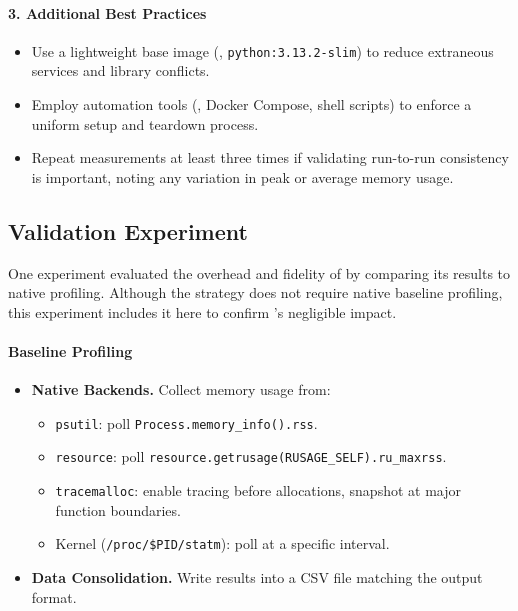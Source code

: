 \paragraph{3. Additional Best Practices}
\begin{itemize}
    \item Use a lightweight base image (\eg, \texttt{python:3.13.2-slim}) to reduce extraneous services and library conflicts.
    \item Employ automation tools (\eg, Docker Compose, shell scripts) to enforce a uniform setup and teardown process.
    \item Repeat measurements at least three times if validating run-to-run consistency is important, noting any variation in peak or average memory usage.
\end{itemize}

\subsection{Validation Experiment}
\label{subsec:validation-experiment}

One experiment evaluated the overhead and fidelity of \traceq by comparing its results to native profiling.
Although the strategy does not require native baseline profiling, this experiment includes it here to confirm \traceq's negligible impact.

\paragraph{Baseline Profiling}
\begin{itemize}

    \item \textbf{Native Backends.} Collect memory usage from:
    \begin{itemize}
        \item \texttt{psutil}: poll \texttt{Process.memory\_info().rss}.
        \item \texttt{resource}: poll \texttt{resource.getrusage(RUSAGE\_SELF).ru\_maxrss}.
        \item \texttt{tracemalloc}: enable tracing before allocations, snapshot at major function boundaries.
        \item Kernel (\texttt{/proc/\$PID/statm}): poll at a specific interval.
    \end{itemize}

    \item \textbf{Data Consolidation.} Write results into a \ac{CSV} file matching the \traceq output format.

\end{itemize}

